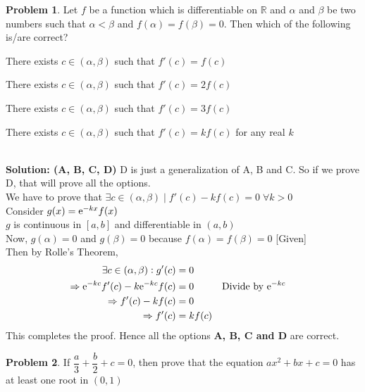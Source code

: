 \documentclass[14]{article}
\theoremstyle{definition}
\newtheorem{prob}{Problem}
\theoremstyle{case}
\begin{document}
\pagebreak
\begin{prob}
Let $f$ be a function which is differentiable on $\mathbb{R}$ and $\alpha$ and $\beta$ be two numbers such that $\alpha < \beta$ and $f(\alpha) = f(\beta) = 0$. Then which of the following is/are correct?\\
\begin{enumerate*}[label=(\Alph*)]
\item There exists $c \in (\alpha, \beta)$ such that $f'(c) = f(c)$\\
\item There exists $c \in (\alpha, \beta)$ such that $f'(c) = 2f(c)$\\
\item There exists $c \in (\alpha, \beta)$ such that $f'(c) = 3f(c)$\\
\item There exists $c \in (\alpha, \beta)$ such that $f'(c) = kf(c)$ for any real $k$\\
\end{enumerate*}\\
\textbf{Solution: (A, B, C, D) } D is just a generalization of A, B and C. So if we prove D, that will prove all the options.\\
We have to prove that $\exists c \in (\alpha, \beta) \mid f'(c) - kf(c) = 0 \;\forall k > 0$\\
Consider $g(x) = {\rm e}^{-kx} f(x)$\\
$g$ is continuous in $[a, b]$ and differentiable in $(a, b)$\\
Now, $g(\alpha) = 0$ and $g(\beta) = 0$ because $f(\alpha) = f(\beta) = 0$ [Given]\\
Then by Rolle's Theorem,
\begin{align*}
\exists c \in (\alpha, \beta) : g'(c) &= 0\\
\Rightarrow {\rm e}^{-kc} f'(c) - k{\rm e}^{-kc}f(c) &= 0 && \text{Divide by } {\rm e}^{-kc}\\
\Rightarrow f'(c) - k f(c) &= 0\\
\Rightarrow f'(c) &= kf(c)
\end{align*}
This completes the proof. Hence all the options \textbf{A, B, C and D} are correct.
\end{prob}
\begin{prob}
If $\dfrac{a}{3} + \dfrac{b}{2} + c = 0$, then prove that the equation $ax^2 + bx + c = 0$ has at least one root in $(0, 1)$
\end{prob}
\end{document}
